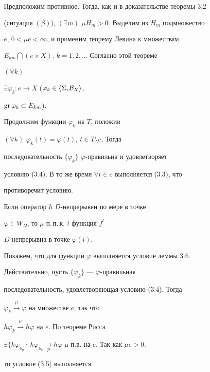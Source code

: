 \begin{pf} Предположим противное. Тогда, как и в доказательстве теоремы 3.2


(ситуация $(\beta)$), $(\exists m)$ $\mu H_m>0$. Выделим из $H_m$ подмножество


$e$, $0<\mu e<\infty$, и применим теорему Левина к множествам


$E_{km}\bigcap(e\times X)$, $k=1,2,\dotsc$ Согласно этой теореме


$(\forall k)$ \;


$\exists\varphi_k:e\to X$ ($\varphi_k\in\langle \Sigma,{\cal B}_X\rangle $,


$\operatorname{gr}\varphi_k\subset E_{km}$).


Продолжим функции $\varphi_k$ на $T$, положив


$(\forall k)$ \; $\varphi_k(t)=\varphi(t)$, $t\in T\setminus e$. Тогда


последовательность $\{\varphi_k\}$ \; $\varphi$-правильна и удовлетворяет


условию (3.4). В то же время $\forall t\in e$ выполняется (3.3), что


противоречит условию.


\end{pf}





\begin{thms} Если оператор $h$ \; $D$-непрерывен по мере в точке


$\varphi\in W_\Omega$, то $\mu$-п.\,п.\,к. $t$ функция $f^t$ \;


$D$-непрерывна в точке $\varphi(t)$.


\end{thms}





\begin{pf} Покажем, что для функции $\varphi$ выполняется условие леммы 3.6.


Действительно, пусть $\{\varphi_k\}$ --- $\varphi$-правильная


последовательность, удовлетворяющая условию (3.4). Тогда


$\varphi_k\overset{\mu}{\longrightarrow}\varphi$ на множестве $e$, так что


$h\varphi_k\overset{\mu}{\longrightarrow}h\varphi$ на $e$. По теореме Рисса


$\exists\{h\varphi_{k_p}\}$ \; $h\varphi_{k_p}\underset{p}


{\longrightarrow}h\varphi$ \; $\mu$-п.в. на $e$. Так как $\mu e>0$,


то условие (3.5) выполняется.


\end{pf}





